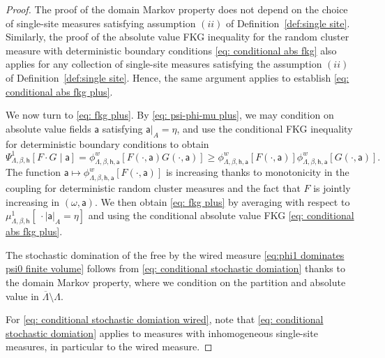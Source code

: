 \documentclass[11pt,a4paper]{article}
\numberwithin{equation}{section}
\theoremstyle{plain}
\theoremstyle{definition}
\begin{document}
\begin{proof}
The proof of the domain Markov property does not depend on the choice of single-site measures satisfying assumption $(ii)$ of Definition~\ref{def:single site}. Similarly, the proof of the absolute value FKG inequality for the random cluster measure with deterministic boundary conditions \eqref{eq: conditional abs fkg} also applies for any collection of single-site measures satisfying the assumption $(ii)$ of Definition~\ref{def:single site}. Hence, the same argument applies to establish \eqref{eq: conditional abs fkg plus}.

We now turn to \eqref{eq: fkg plus}. By \eqref{eq: psi-phi-mu plus}, we may condition on absolute value fields $\mathsf a$ satisfying $\mathsf a|_A=\eta$, and use the conditional FKG inequality for deterministic boundary conditions to obtain
\begin{equation}
    \Psi^1_{\Lambda,\beta,\mathsf h}[F \cdot G \mid \mathsf a] = \phi^w_{\Lambda, \beta, \mathsf h, \mathsf a}[ F(\cdot, \mathsf a) G(\cdot, \mathsf a) ] \geq \phi^w_{\Lambda, \beta, \mathsf h, \mathsf a}[F(\cdot,\mathsf a)] \phi^w_{\Lambda, \beta, \mathsf h, \mathsf a}[G(\cdot,\mathsf a)]. 
\end{equation}
The function $\mathsf a \mapsto \phi^w_{\Lambda, \beta, \mathsf h, \mathsf a}[F(\cdot,\mathsf a)]$ is increasing thanks to monotonicity in the coupling for deterministic random cluster measures and the fact that $F$ is jointly increasing in $(\omega, \mathsf a)$. We then obtain \eqref{eq: fkg plus} by averaging with respect to $\mu^1_{\Lambda,\beta, \mathsf h}[\:\cdot \mid \mathsf a|_A=\eta]$ and using the conditional absolute value FKG \eqref{eq: conditional abs fkg plus}. 

The stochastic domination of the free by the wired measure \eqref{eq:phi1 dominates psi0 finite volume} follows from \eqref{eq: conditional stochastic domiation} thanks to the domain Markov property, where we condition on the partition and absolute value in $\overline{\Lambda}\setminus \Lambda$.  

For \eqref{eq: conditional stochastic domiation wired}, note that \eqref{eq: conditional stochastic domiation} applies to measures with inhomogeneous single-site measures, in particular to the wired measure.


\end{proof}
\end{document}
